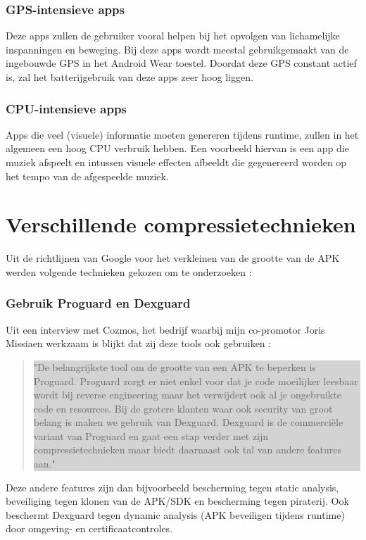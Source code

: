 \subsubsection{GPS-intensieve apps}
Deze apps zullen de gebruiker vooral helpen bij het opvolgen van lichamelijke inspanningen en beweging. Bij deze apps wordt meestal gebruikgemaakt van de ingebouwde GPS in het Android Wear toestel. Doordat deze GPS constant actief is, zal het batterijgebruik van deze apps zeer hoog liggen.
\subsubsection{CPU-intensieve apps}
Apps die veel (visuele) informatie moeten genereren tijdens runtime, zullen in het algemeen een hoog CPU verbruik hebben. Een voorbeeld hiervan is een app die muziek afspeelt en intussen visuele effecten afbeeldt die gegenereerd worden op het tempo van de afgespeelde muziek.  

\section{Verschillende compressietechnieken}
\label{sec:compressietechnieken}

Uit de richtlijnen van Google voor het verkleinen van de grootte van de APK werden volgende technieken gekozen om te onderzoeken \autocite{googlereduceapksize}: 

\subsubsection{Gebruik Proguard en Dexguard}
Uit een interview met Cozmos, het bedrijf waarbij mijn co-promotor Joris Missiaen werkzaam is blijkt dat zij deze tools ook gebruiken : 
\begin{quote}
	\colorbox{lightgray}{\parbox{350px}{"De belangrijkste tool om de grootte van een APK te beperken is Proguard. Proguard zorgt er niet enkel voor dat je code moeilijker leesbaar wordt bij reverse engineering maar het verwijdert ook al je ongebruikte code en resources.
			Bij de grotere klanten waar ook security van groot belang is maken we gebruik van Dexguard. Dexguard is de commerciële variant van Proguard en gaat een stap verder met zijn compressietechnieken maar biedt daarnaast ook tal van andere features aan."
	}}
\end{quote}
Deze andere features zijn dan bijvoorbeeld bescherming tegen static analysis, beveiliging tegen klonen van de APK/SDK en bescherming tegen piraterij. Ook beschermt Dexguard tegen dynamic analysis (APK beveiligen tijdens runtime) door omgeving- en certificaatcontroles. 

